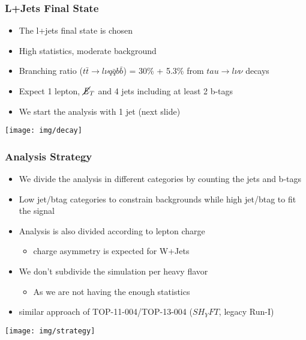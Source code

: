 \documentclass{beamer}
\begin{document}
\begin{frame}
\frametitle{L+Jets Final State}
\begin{itemize}
\item The l+jets final state is chosen
\item High statistics, moderate background
\item Branching ratio ($t\bar{t} \rightarrow l\nu q\bar{q} b\bar{b}$) = 30\% + 5.3\% from $tau \rightarrow l\nu\nu$ decays
\item Expect 1 lepton, $\cancel{\it{E}}_{T}$ and 4 jets including at least 2 b-tags
\item We start the analysis with 1 jet (next slide)
\end{itemize}
\begin{center}
 \texttt{[image: img/decay]}
\end{center}
\end{frame}
\begin{frame}
\frametitle{Analysis Strategy}
\scriptsize
\begin{itemize}
\item We divide the analysis in different categories by counting the jets and b-tags
\item Low jet/btag categories to constrain backgrounds while high jet/btag to fit the signal
\item Analysis is also divided according to lepton charge
\begin{itemize}
\item charge asymmetry is expected for W+Jets
\end{itemize}
\item We don't subdivide the simulation per heavy flavor
\begin{itemize}
\item As we are not having the enough statistics 
\end{itemize}
\item similar approach of TOP-11-004/TOP-13-004 ($SH_YFT$, legacy Run-I)
\end{itemize}
\begin{center}
 \texttt{[image: img/strategy]}
\end{center}
\end{frame}
\end{document}
